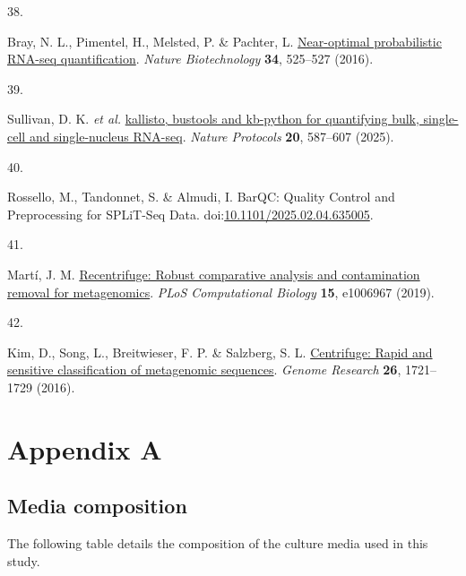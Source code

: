 \documentclass[
  11pt,
  a4paper,
]{report}
\newlength{\cslhangindent}
\newlength{\csllabelwidth}
\newenvironment{CSLReferences}[2] %
 {\begin{list}{}{%
  \setlength{\itemindent}{0pt}
  \setlength{\leftmargin}{0pt}
  \setlength{\parsep}{0pt}
  \ifodd #1
   \setlength{\leftmargin}{\cslhangindent}
   \setlength{\itemindent}{-1\cslhangindent}
  \fi
  \setlength{\itemsep}{#2\baselineskip}}}
 {\end{list}}
\newcommand{\CSLLeftMargin}[1]{\parbox[t]{\csllabelwidth}{\strut#1\strut}}
\newcommand{\CSLRightInline}[1]{\parbox[t]{\linewidth - \csllabelwidth}{\strut#1\strut}}
\begin{document}
\begin{CSLReferences}{0}{0}
\CSLLeftMargin{38. }%
\CSLRightInline{Bray, N. L., Pimentel, H., Melsted, P. \& Pachter, L.
\href{https://doi.org/10.1038/nbt.3519}{Near-optimal probabilistic
RNA-seq quantification}. \emph{Nature Biotechnology} \textbf{34},
525--527 (2016).}

\CSLLeftMargin{39. }%
\CSLRightInline{Sullivan, D. K. \emph{et al.}
\href{https://doi.org/10.1038/s41596-024-01057-0}{kallisto, bustools and
kb-python for quantifying bulk, single-cell and single-nucleus RNA-seq}.
\emph{Nature Protocols} \textbf{20}, 587--607 (2025).}

\CSLLeftMargin{40. }%
\CSLRightInline{Rossello, M., Tandonnet, S. \& Almudi, I. BarQC: Quality
Control and Preprocessing for SPLiT-Seq Data.
doi:\href{https://doi.org/10.1101/2025.02.04.635005}{10.1101/2025.02.04.635005}.}

\CSLLeftMargin{41. }%
\CSLRightInline{Martí, J. M.
\href{https://doi.org/10.1371/journal.pcbi.1006967}{Recentrifuge: Robust
comparative analysis and contamination removal for metagenomics}.
\emph{PLoS Computational Biology} \textbf{15}, e1006967 (2019).}

\CSLLeftMargin{42. }%
\CSLRightInline{Kim, D., Song, L., Breitwieser, F. P. \& Salzberg, S. L.
\href{https://doi.org/10.1101/gr.210641.116}{Centrifuge: Rapid and
sensitive classification of metagenomic sequences}. \emph{Genome
Research} \textbf{26}, 1721--1729 (2016).}

\end{CSLReferences}

\cleardoublepage
{}
{}
\appendix

\chapter{Appendix A}\label{sec-appendix-a}

\section{Media composition}\label{sec-appendix-media}

The following table details the composition of the culture media used in
this study.
\end{document}
